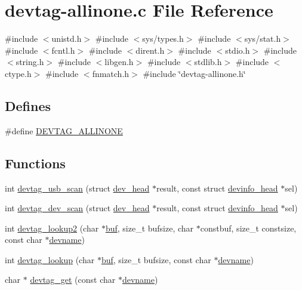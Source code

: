 \hypertarget{devtag-allinone_8c}{\section{devtag-\/allinone.c \-File \-Reference}
\label{devtag-allinone_8c}
}
{\ttfamily \#include $<$unistd.\-h$>$}\*
{\ttfamily \#include $<$sys/types.\-h$>$}\*
{\ttfamily \#include $<$sys/stat.\-h$>$}\*
{\ttfamily \#include $<$fcntl.\-h$>$}\*
{\ttfamily \#include $<$dirent.\-h$>$}\*
{\ttfamily \#include $<$stdio.\-h$>$}\*
{\ttfamily \#include $<$string.\-h$>$}\*
{\ttfamily \#include $<$libgen.\-h$>$}\*
{\ttfamily \#include $<$stdlib.\-h$>$}\*
{\ttfamily \#include $<$ctype.\-h$>$}\*
{\ttfamily \#include $<$fnmatch.\-h$>$}\*
{\ttfamily \#include \char`\"{}devtag-\/allinone.\-h\char`\"{}}\*
\subsection*{\-Defines}
\begin{DoxyCompactItemize}
\item 
\#define \hyperlink{devtag-allinone_8c_a811fa6fdea0dbbbfa56110c88aeb4094}{\-D\-E\-V\-T\-A\-G\-\_\-\-A\-L\-L\-I\-N\-O\-N\-E}
\end{DoxyCompactItemize}
\subsection*{\-Functions}
\begin{DoxyCompactItemize}
\item 
int \hyperlink{devtag-allinone_8c_a3af117dd76b7f99155371b5d48c72614}{devtag\-\_\-usb\-\_\-scan} (struct \hyperlink{structdev__head}{dev\-\_\-head} $\ast$result, const struct \hyperlink{structdevinfo__head}{devinfo\-\_\-head} $\ast$sel)
\item 
int \hyperlink{devtag-allinone_8c_a6e9cc1f68b141169581043a3db7f53a2}{devtag\-\_\-dev\-\_\-scan} (struct \hyperlink{structdev__head}{dev\-\_\-head} $\ast$result, const struct \hyperlink{structdevinfo__head}{devinfo\-\_\-head} $\ast$sel)
\item 
int \hyperlink{devtag-allinone_8c_add29945e3d6a148a07a6cfff5bb9c3e9}{devtag\-\_\-lookup2} (char $\ast$\hyperlink{radiotftp_8c_a23a861dc493bd6b8f4542432ff6b6b8c}{buf}, size\-\_\-t bufsize, char $\ast$constbuf, size\-\_\-t constsize, const char $\ast$\hyperlink{structdevname}{devname})
\item 
int \hyperlink{devtag-allinone_8c_aa2399c3971b5eedb3d82520e5103e65e}{devtag\-\_\-lookup} (char $\ast$\hyperlink{radiotftp_8c_a23a861dc493bd6b8f4542432ff6b6b8c}{buf}, size\-\_\-t bufsize, const char $\ast$\hyperlink{structdevname}{devname})
\item 
char $\ast$ \hyperlink{devtag-allinone_8c_af276262facc7dcc552f6f8fee1f74802}{devtag\-\_\-get} (const char $\ast$\hyperlink{structdevname}{devname})
\end{DoxyCompactItemize}


